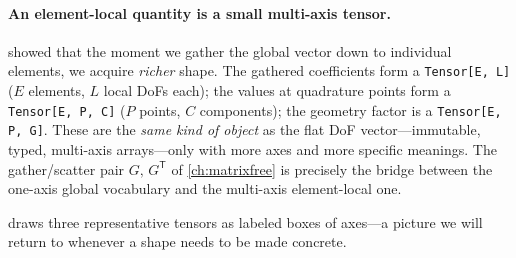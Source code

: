 \paragraph{An element-local quantity is a small multi-axis tensor.}
 showed that the moment we gather the global vector down to
individual elements, we acquire \emph{richer} shape. The gathered coefficients
form a \lstinline[style=l4style]|Tensor[E, L]| ($E$ elements, $L$ local DoFs
each); the values at quadrature points form a
\lstinline[style=l4style]|Tensor[E, P, C]| ($P$ points, $C$ components); the
geometry factor is a \lstinline[style=l4style]|Tensor[E, P, G]|. These are the
\emph{same kind of object} as the flat DoF vector---immutable, typed, multi-axis
arrays---only with more axes and more specific meanings. The gather/scatter pair
$G,\,G^{\mathsf T}$ of \cref{ch:matrixfree} is precisely the bridge between the
one-axis global vocabulary and the multi-axis element-local one.

 draws three representative tensors as labeled boxes of axes---a
picture we will return to whenever a shape needs to be made concrete.

